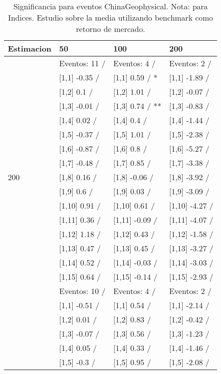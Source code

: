 \begin{table}

\caption{Significancia para eventos ChinaGeophysical. Nota: para Indices. Estudio sobre la media utilizando benchmark como retorno de mercado.}
\centering
\begin{tabular}[t]{llll}
\toprule
Estimacion & 50 & 100 & 200\\
\midrule
 & Eventos:  11 / & Eventos:  4 / & Eventos:  2 /\\
 & {}[1,1] -0.35  / & {}[1,1] 0.59  / * & {}[1,1] -1.89  /\\
 & {}[1,2] 0.1  / & {}[1,2] 1.01  / & {}[1,2] -0.07  /\\
 & {}[1,3] -0.01  / & {}[1,3] 0.74  / ** & {}[1,3] -0.83  /\\
 & {}[1,4] 0.02  / & {}[1,4] 0.4  / & {}[1,4] -1.44  /\\
\addlinespace
 & {}[1,5] -0.37  / & {}[1,5] 1.01  / & {}[1,5] -2.38  /\\
 & {}[1,6] -0.87  / & {}[1,6] 0.8  / & {}[1,6] -5.27  /\\
 & {}[1,7] -0.48  / & {}[1,7] 0.85  / & {}[1,7] -3.38  /\\
200 & {}[1,8] 0.16  / & {}[1,8] -0.06  / & {}[1,8] -3.92  /\\
 & {}[1,9] 0.6  / & {}[1,9] 0.03  / & {}[1,9] -3.09  /\\
\addlinespace
 & {}[1,10] 0.91  / & {}[1,10] 0.61  / & {}[1,10] -4.27  /\\
 & {}[1,11] 0.36  / & {}[1,11] -0.09  / & {}[1,11] -4.07  /\\
 & {}[1,12] 1.18  / & {}[1,12] 0.43  / & {}[1,12] -1.58  /\\
 & {}[1,13] 0.47  / & {}[1,13] 0.45  / & {}[1,13] -3.27  /\\
 & {}[1,14] 0.52  / & {}[1,14] -0.03  / & {}[1,14] -3.03  /\\
\addlinespace
 & {}[1,15] 0.64  / & {}[1,15] -0.14  / & {}[1,15] -2.93  /\\
 & Eventos:  10 / & Eventos:  4 / & Eventos:  2 /\\
 & {}[1,1] -0.51  / & {}[1,1] 0.54  / & {}[1,1] -2.14  /\\
 & {}[1,2] 0.01  / & {}[1,2] 0.83  / & {}[1,2] -0.42  /\\
 & {}[1,3] -0.07  / & {}[1,3] 0.56  / & {}[1,3] -1.23  /\\
\addlinespace
 & {}[1,4] 0.05  / & {}[1,4] 0.33  / & {}[1,4] -1.46  /\\
 & {}[1,5] -0.3  / & {}[1,5] 0.95  / & {}[1,5] -2.08  /\\

\end{tabular}
\end{table}
